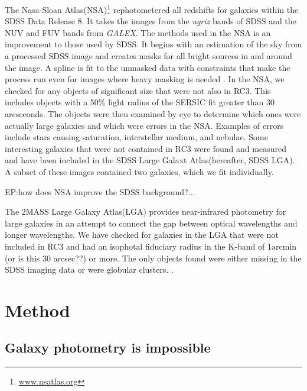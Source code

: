 \documentclass[12pt,preprint,pdftex]{aastex}
\newcommand{\units}[1]{\mathrm{#1}}
\renewcommand{\arcmin}{\units{arcmin}}
\begin{document}
The Nasa-Sloan Atlas(NSA)\footnote{\url{www.nsatlas.org}}
rephotometered all redshifts for galaxies within the SDSS Data Release
8. It takes the images from the \textit{ugriz} bands of SDSS and the
NUV and FUV bands from \textit{GALEX}. The methods used in the NSA is
an improvement to those used by SDSS. It begins with an estimation of
the sky from a processed SDSS image and creates masks for all bright
sources in and around the image. A spline is fit to the unmasked data
with constraints that make the process run even for images where heavy
masking is needed \citep{blanton11}. In the NSA, we checked for any
objects of significant size that were not also in RC3. This includes
objects with a 50\% light radius of the SERSIC fit greater than 30
arcseconds. The objects were then examined by eye to determine which
ones were actually large galaxies and which were errors in the
NSA. Examples of errors include stars causing saturation, interstellar
medium, and nebulae. Some interesting galaxies that were not contained
in RC3 were found and measured and have been included in the SDSS
Large Galaxt Atlas(hereafter, SDSS LGA). A subset of these images
contained two galaxies, which we fit individually.

EP:how does NSA improve the SDSS background?...
 
The 2MASS Large Galaxy Atlas(LGA) provides near-infrared photometry
for large galaxies in an attempt to connect the gap between optical
wavelengths and longer wavelengths. We have checked for galaxies in
the LGA that were not included in RC3 and had an isophotal fiduciary
radius in the K-band of $1\arcmin$(or is this 30 arcsec??) or
more. The only objects found were either missing in the SDSS imaging
data or were globular clusters.  \citep{jarrett03}.

\section{Method} \label{sec:method}
\subsection{Galaxy photometry is impossible}\label{sec:philosophy}
\end{document}
